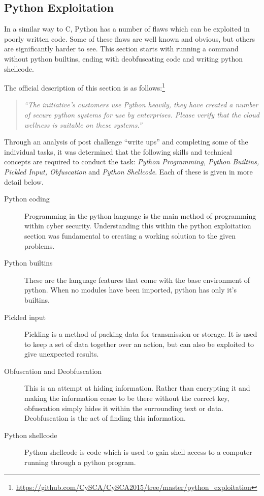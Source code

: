 \documentclass[twoside,a4paper,11pt]{report}
\begin{document}
		\subsection{Python Exploitation}
			In a similar way to C, Python has a number of flaws which can be exploited in poorly written code. 
			Some of these flaws are well known and obvious, but others are significantly harder to see. 
			This section starts with running a command without python builtins, ending with deobfuscating code and writing python shellcode. 

			The official description of this section is as follows:\footnote{\url{https://github.com/CySCA/CySCA2015/tree/master/python\_exploitation}}
			\begin{quote}
				\textit{``The initiative's customers use Python heavily, they have created a number of secure python systems for use by enterprises. Please verify that the cloud wellness is suitable on these systems.''}
			\end{quote}

			Through an analysis of post challenge ``write ups'' and completing some of the individual tasks, 
			it was determined that the following skills and technical concepts are required to conduct the task: 
			\textit{Python Programming, Python Builtins, Pickled Input, Obfuscation} and \textit{Python Shellcode}.
			Each of these is given in more detail below. 
			\begin{description}
				\item[Python coding]
					Programming in the python language is the main method of programming within cyber security. 
					Understanding this within the python exploitation section was fundamental to creating a working solution to the given problems. 
				\item[Python builtins]
					These are the language features that come with the base environment of python. 
					When no modules have been imported, python has only it's builtins. 
				\item[Pickled input]
					Pickling is a method of packing data for transmission or storage. 
					It is used to keep a set of data together over an action, but can also be exploited to give unexpected results. 
				\item[Obfuscation and Deobfuscation]
					This is an attempt at hiding information. 
					Rather than encrypting it and making the information cease to be there without the correct key, obfuscation simply hides it within the surrounding text or data. 
					Deobfuscation is the act of finding this information.
				\item[Python shellcode] 
					Python shellcode is code which is used to gain shell access to a computer running through a python program. 
			\end{description}
\end{document}
